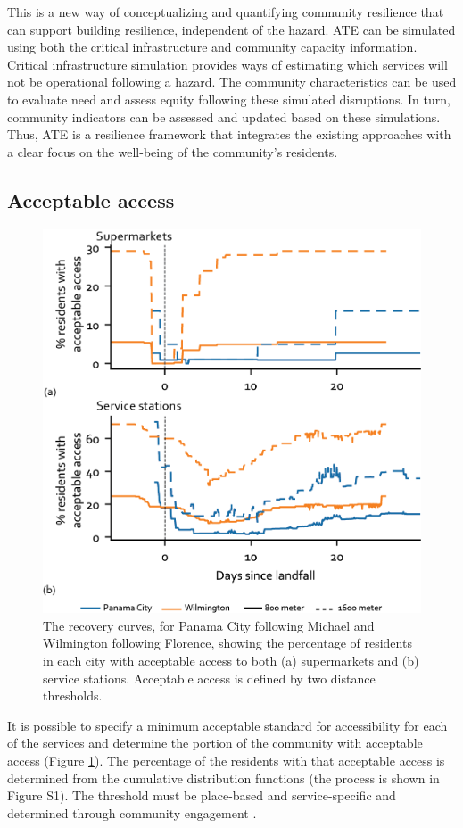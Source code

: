 \documentclass[9pt,twocolumn,twoside,lineno]{pnas-new}
\begin{document}
This is a new way of conceptualizing and quantifying community resilience that can support building resilience, independent of the hazard.
ATE can be simulated using both the critical infrastructure and community capacity information.
Critical infrastructure simulation provides ways of estimating which services will not be operational following a hazard.
The community characteristics can be used to evaluate need and assess equity following these simulated disruptions.
In turn, community indicators can be assessed and updated based on these simulations.
Thus, ATE is a resilience framework that integrates the existing approaches with a clear focus on the well-being of the community's residents.

\subsection*{Acceptable access}
\begin{figure}
    \centering
    \includegraphics[width=0.8\linewidth]{report/fig/sufficient_only.png}
    \caption{The recovery curves, for Panama City following Michael and Wilmington following Florence, showing the percentage of residents in each city with acceptable access to both (a) supermarkets and (b) service stations. Acceptable access is defined by two distance thresholds. 
    }
    \label{fig:threshold}
\end{figure}

It is possible to specify a minimum acceptable standard for accessibility for each of the services and determine the portion of the community with acceptable access (Figure \ref{fig:threshold}). 
The percentage of the residents with that acceptable access is determined from the cumulative distribution functions (the process is shown in Figure S1). 
The threshold must be place-based and service-specific and determined through community engagement \cite{Pantelic1991-qu, United_Nations_Educational_Scientific_and_Cultural_Organization2018-sf}.
\end{document}
